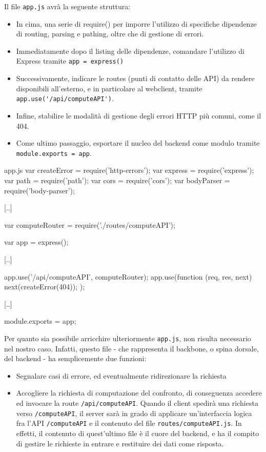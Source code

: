 Il file \verb|app.js| avrà la seguente struttura:

\begin{itemize}
  \item In cima, una serie di require() per imporre l'utilizzo di specifiche dipendenze di routing, parsing e pathing, oltre che di gestione di errori.
  \item Immediatamente dopo il listing delle dipendenze, comandare l'utilizzo di Express tramite \verb|app = express()|
  \item Successivamente, indicare le routes (punti di contatto delle API) da rendere disponibili all'esterno, e in particolare al webclient, tramite \verb|app.use('/api/computeAPI')|. 
  \item Infine, stabilire le modalità di gestione degli errori HTTP più comuni, come il 404.
  \item Come ultimo passaggio, esportare il nucleo del backend come modulo tramite \verb|module.exports = app|.
\end{itemize}
    
\begin{sexylisting}{app.js}
var createError = require('http-errors');
var express = require('express');
var path = require('path');
var cors = require('cors');
var bodyParser = require('body-parser');

[..]

var computeRouter = require('./routes/computeAPI');

var app = express();

[..]

app.use('/api/computeAPI', computeRouter);
app.use(function (req, res, next) {
	next(createError(404));
});

[..]

module.exports = app;
\end{sexylisting}

Per quanto sia possibile arricchire ulteriormente \verb|app.js|, non risulta necessario nel nostro caso. Infatti, questo file - che rappresenta il backbone, o spina dorsale, del backend - ha semplicemente due funzioni:

\begin{itemize}
    \item Segnalare casi di errore, ed eventualmente ridirezionare la richiesta
    \item Accogliere la richiesta di computazione del confronto, di conseguenza accedere ed invocare la route \verb|/api/computeAPI|. Quando il client spedirà una richiesta verso \verb|/computeAPI|, il server sarà in grado di applicare un'interfaccia logica fra l'API \verb|/computeAPI| e il contenuto del file \verb|routes/computeAPI.js|. In effetti, il contenuto di quest'ultimo file è il cuore del backend, e ha il compito di gestire le richieste in entrare e restituire dei dati come risposta.
\end{itemize}

